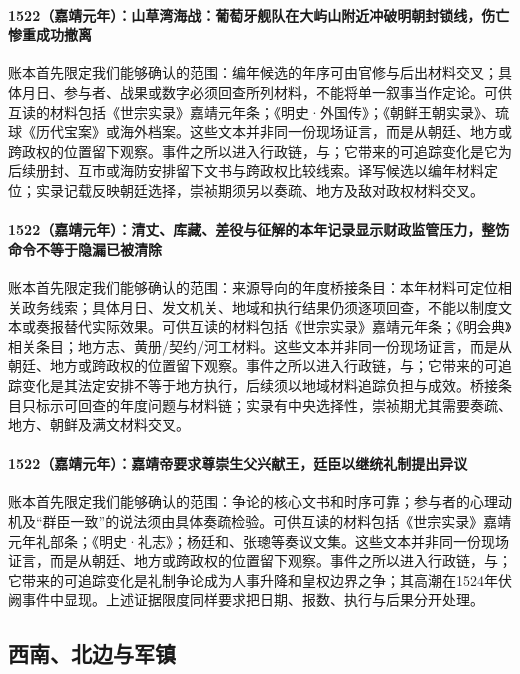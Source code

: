 \paragraph{1522（嘉靖元年）：山草湾海战：葡萄牙舰队在大屿山附近冲破明朝封锁线，伤亡惨重成功撤离} 账本首先限定我们能够确认的范围：编年候选的年序可由官修与后出材料交叉；具体月日、参与者、战果或数字必须回查所列材料，不能将单一叙事当作定论。可供互读的材料包括《世宗实录》嘉靖元年条；《明史·外国传》；《朝鲜王朝实录》、琉球《历代宝案》或海外档案。这些文本并非同一份现场证言，而是从朝廷、地方或跨政权的位置留下观察。事件之所以进入行政链，与；它带来的可追踪变化是它为后续册封、互市或海防安排留下文书与跨政权比较线索。译写候选以编年材料定位；实录记载反映朝廷选择，崇祯期须另以奏疏、地方及敌对政权材料交叉。

\paragraph{1522（嘉靖元年）：清丈、库藏、差役与征解的本年记录显示财政监管压力，整饬命令不等于隐漏已被清除} 账本首先限定我们能够确认的范围：来源导向的年度桥接条目：本年材料可定位相关政务线索；具体月日、发文机关、地域和执行结果仍须逐项回查，不能以制度文本或奏报替代实际效果。可供互读的材料包括《世宗实录》嘉靖元年条；《明会典》相关条目；地方志、黄册/契约/河工材料。这些文本并非同一份现场证言，而是从朝廷、地方或跨政权的位置留下观察。事件之所以进入行政链，与；它带来的可追踪变化是其法定安排不等于地方执行，后续须以地域材料追踪负担与成效。桥接条目只标示可回查的年度问题与材料链；实录有中央选择性，崇祯期尤其需要奏疏、地方、朝鲜及满文材料交叉。

\paragraph{1522（嘉靖元年）：嘉靖帝要求尊崇生父兴献王，廷臣以继统礼制提出异议} 账本首先限定我们能够确认的范围：争论的核心文书和时序可靠；参与者的心理动机及“群臣一致”的说法须由具体奏疏检验。可供互读的材料包括《世宗实录》嘉靖元年礼部条；《明史·礼志》；杨廷和、张璁等奏议文集。这些文本并非同一份现场证言，而是从朝廷、地方或跨政权的位置留下观察。事件之所以进入行政链，与；它带来的可追踪变化是礼制争论成为人事升降和皇权边界之争；其高潮在1524年伏阙事件中显现。上述证据限度同样要求把日期、报数、执行与后果分开处理。

\subsection{西南、北边与军镇}

